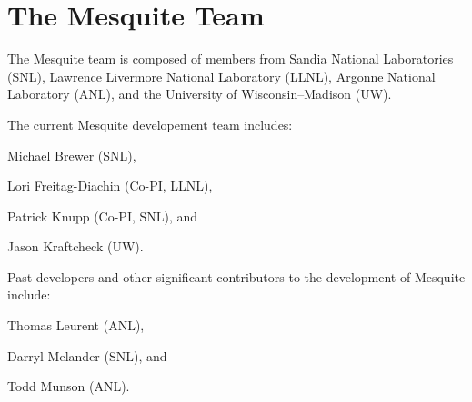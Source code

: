 \chapter{The Mesquite Team}

The Mesquite team is composed of members from Sandia
National Laboratories (SNL), Lawrence Livermore National Laboratory (LLNL),
 Argonne National Laboratory (ANL), and the University of Wisconsin--Madison (UW).\newline
 
\noindent The current Mesquite developement team includes: \newline

Michael Brewer (SNL), \newline

Lori Freitag-Diachin (Co-PI, LLNL), \newline

Patrick Knupp (Co-PI, SNL), and \newline

Jason Kraftcheck (UW).  \newline

\noindent Past developers and other significant contributors to
the development of Mesquite include:\newline

Thomas Leurent (ANL), \newline

Darryl Melander (SNL), and \newline

Todd Munson (ANL).  \newline


